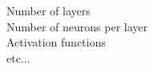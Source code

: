 \documentclass[preview]{standalone}
\begin{document}
Number of layers\\Number of neurons per layer\\Activation functions\\etc...\\
\end{document}
